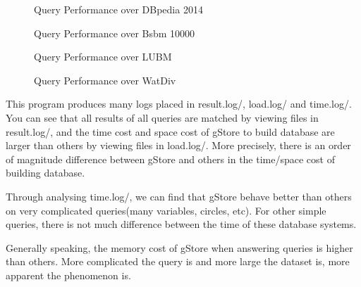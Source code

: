\documentclass[titlepage, a4paper, 12pt]{article}
\begin{document}
\begin{figure}[b]%
		\resizebox{0.48\columnwidth}{!}{
			
		}
 \caption{Query Performance over DBpedia 2014}%
 \label{fig:dbpedia2014Performance}
\end{figure}

\begin{figure}%
		\resizebox{0.8\columnwidth}{!}{
			
		}
 \caption{Query Performance over Bsbm 10000}%
 \label{fig:Bsbm10000Performance}
\end{figure}

\begin{figure}[h]%
\subfigure[LUBM 5000]{%
		\resizebox{0.98\columnwidth}{!}{
			
		}
	   \label{fig:LUBM5000Performance}%
	   }%
 \caption{Query Performance over LUBM}%
 \label{fig:LUBMPerformance}
\end{figure}

\begin{figure}[h]%
\subfigure[WatDiv 300M]{%
		\resizebox{0.8\columnwidth}{!}{
			
		}
	   \label{fig:WatDiv300MPerformance}%
	   }%
 \caption{Query Performance over WatDiv}%
 \label{fig:WatDivPerformance}
\end{figure}


This program produces many logs placed in result.log/, load.log/ and
time.log/. You can see that all results of all queries are matched by
viewing files in result.log/, and the time cost and space cost of gStore
to build database are larger than others by viewing files in load.log/.
More precisely, there is an order of magnitude difference between gStore
and others in the time/space cost of building database.

Through analysing time.log/, we can find that gStore behave better than
others on very complicated queries(many variables, circles, etc). For
other simple queries, there is not much difference between the time of
these database systems.

Generally speaking, the memory cost of gStore when answering queries is
higher than others. More complicated the query is and more large the
dataset is, more apparent the phenomenon is.
\end{document}
